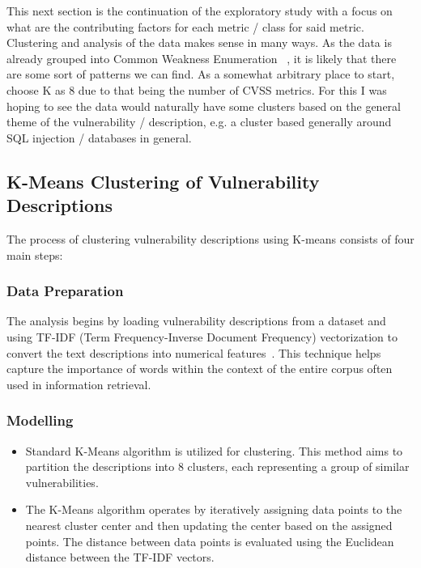 \documentclass[12pt]{article}
\begin{document}
This next section is the continuation of the exploratory study with a focus on what are the
contributing factors for each metric / class for said metric. Clustering and analysis of the data
makes sense in many ways. As the data is already grouped into Common Weakness Enumeration~\cite{CWE}
, it is likely that there are some sort of patterns we can find. As a somewhat arbitrary place to
start, choose K as 8 due to that being the number of CVSS metrics. For this I was hoping to see the
data would naturally have some clusters based on the general theme of the vulnerability /
description, e.g. a cluster based generally around SQL injection / databases in general.


\subsection{K-Means Clustering of Vulnerability Descriptions}

The process of clustering vulnerability descriptions using K-means consists of four main steps:

\subsubsection*{Data Preparation}

The analysis begins by loading vulnerability descriptions from a dataset and using TF-IDF
(Term Frequency-Inverse Document Frequency) vectorization to convert the text
descriptions into numerical features~\cite{tfidf}. This technique helps capture the
importance of words within the context of the entire corpus often used in information
retrieval.


\subsubsection*{Modelling}

\begin{itemize}

	\item Standard K-Means algorithm is utilized for clustering. This method aims to partition the
	      descriptions into 8 clusters, each representing a group of similar
	      vulnerabilities.

	\item The K-Means algorithm operates by iteratively assigning data points to the nearest cluster
	      center and then updating the center based on the assigned points. The distance between
	      data points is evaluated using the Euclidean distance between the TF-IDF vectors.

\end{itemize}
\end{document}
